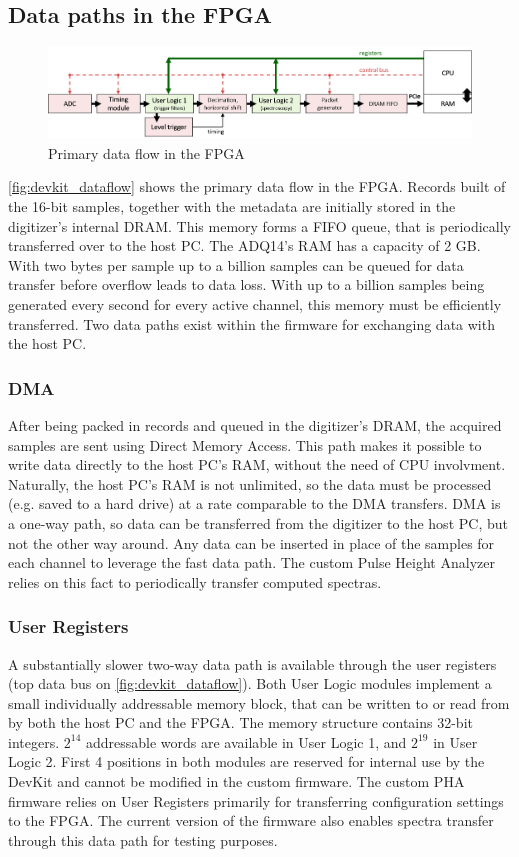 \documentclass[a4paper,12pt,table]{article}
\begin{document}
	\subsection{Data paths in the FPGA}
		\begin{figure}[!h]
			\centering
			\includegraphics[width=\textwidth]{img/devkit_dataflow.png}
			\caption{Primary data flow in the FPGA}\label{fig:devkit_dataflow}
		\end{figure}
		\autoref{fig:devkit_dataflow} shows the primary data flow in the FPGA.
		Records built of the 16-bit samples, 
		together with the metadata are initially stored in the digitizer's internal DRAM. 
		This memory forms a FIFO queue, that is periodically transferred over to the host PC. 
		The ADQ14's RAM has a capacity of 2 GB. 
		With two bytes per sample up to a billion samples can be queued
		for data transfer before overflow leads to data loss. 
		With up to a billion samples being generated every second for every active channel, 
		this memory must be efficiently transferred.
		Two data paths exist within the firmware for exchanging data with the host PC.
		\subsubsection{DMA}
		After being packed in records and queued in the digitizer's DRAM, the acquired samples are sent
		using Direct Memory Access. This path makes it possible to write data directly to the host PC's RAM, 
		without the need of CPU involvment. Naturally, the host PC's RAM is not unlimited, 
		so the data must be processed (e.g. saved to a hard drive) at a rate comparable to the DMA transfers.
		DMA is a one-way path, so data can be transferred from the digitizer to the host PC,
		but not the other way around.
		Any data can be inserted in place of the samples for each channel to leverage the fast data path. 
		The custom Pulse Height Analyzer relies on this fact to periodically transfer computed spectras.
		\subsubsection{User Registers}
		A substantially slower two-way data path is available through the user registers 
		(top data bus on \autoref{fig:devkit_dataflow}). 
		Both User Logic modules implement a small individually addressable memory block, 
		that can be written to or read from by both the host PC and the FPGA. 
		The memory structure contains 32-bit integers. $2^{14}$ addressable words
		are available in User Logic 1, and $2^{19}$ in User Logic 2. 
		First 4 positions in both modules are reserved  for internal use by the DevKit 
		and cannot be modified in the custom firmware. The custom PHA firmware
		relies on User Registers primarily for transferring configuration settings to the FPGA.
		The current version of the firmware also enables spectra transfer 
		through this data path for testing purposes.
\end{document}
